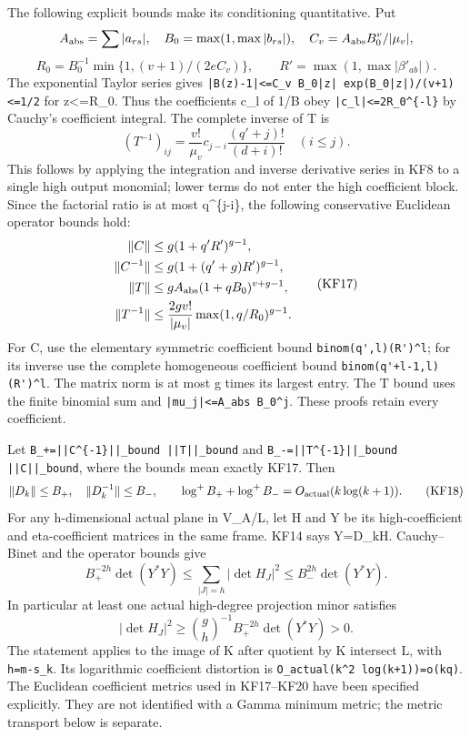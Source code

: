 The following explicit bounds make its conditioning quantitative. Put \[
A_{\rm abs}=\sum|a_{rs}|,\quad B_0=\max(1,\max|b_{rs}|),
\quad C_v=A_{\rm abs}B_0^v/|\mu_v|,
\] \[
R_0=B_0^{-1}\min\{1,(v+1)/(2eC_v)\},\qquad
R'=\max(1,\max|\beta'_{ab}|).
\tag{KF15}
\] The exponential Taylor series gives \nolinkurl{|B(z)-1|<=C_v B_0|z| exp(B_0|z|)/(v+1)<=1/2} for \textbar z\textbar\textless=R\_0. Thus the coefficients c\_l of 1/B obey \nolinkurl{|c_l|<=2R_0^{-l}} by Cauchy's coefficient integral. The complete inverse of T is \[
(T^{-1})_{ij}=\frac{v!}{\mu_v}c_{j-i}
 \frac{(q'+j)!}{(d+i)!}\quad(i\le j).
\tag{KF16}
\] This follows by applying the integration and inverse derivative series in KF8 to a single high output monomial; lower terms do not enter the high coefficient block. Since the factorial ratio is at most q\^{}\{j-i\}, the following conservative Euclidean operator bounds hold: \[
\begin{split}
\|C\|&\le g(1+q'R')^{g-1},\\
\|C^{-1}\|&\le g(1+(q'+g)R')^{g-1},\\
\|T\|&\le gA_{\rm abs}(1+qB_0)^{v+g-1},\\
\|T^{-1}\|&\le\frac{2gv!}{|\mu_v|}
                 \max(1,q/R_0)^{g-1}.
\end{split}\tag{KF17}
\] For C, use the elementary symmetric coefficient bound \nolinkurl{binom(q',l)(R')^l}; for its inverse use the complete homogeneous coefficient bound \nolinkurl{binom(q'+l-1,l)(R')^l}. The matrix norm is at most g times its largest entry. The T bound uses the finite binomial sum and \nolinkurl{|mu_j|<=A_abs B_0^j}. These proofs retain every coefficient.

Let \nolinkurl{B_+=||C^{-1}||_bound ||T||_bound} and \nolinkurl{B_-=||T^{-1}||_bound ||C||_bound}, where the bounds mean exactly KF17. Then \[
\|D_k\|\le B_+,\quad\|D_k^{-1}\|\le B_-,\qquad
\log^+B_++\log^+B_-=O_{\rm actual}(k\log(k+1)).
\tag{KF18}
\] For any h-dimensional actual plane in V\_A/L, let H and Y be its high-coefficient and eta-coefficient matrices in the same frame. KF14 says Y=D\_kH. Cauchy--Binet and the operator bounds give \[
B_+^{-2h}\det(Y^*Y)
\le\sum_{|J|=h}|\det H_J|^2
\le B_-^{2h}\det(Y^*Y).
\tag{KF19}
\] In particular at least one actual high-degree projection minor satisfies \[
|\det H_J|^2\ge
\binom gh^{-1}B_+^{-2h}\det(Y^*Y)>0.
\tag{KF20}
\] The statement applies to the image of K after quotient by K intersect L, with \texttt{h=m-s\_k}. Its logarithmic coefficient distortion is \nolinkurl{O_actual(k^2 log(k+1))=o(kq)}. The Euclidean coefficient metrics used in KF17--KF20 have been specified explicitly. They are not identified with a Gamma minimum metric; the metric transport below is separate.

